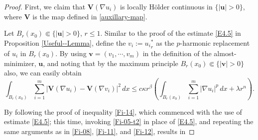 \documentclass{amsart}
\begin{document}
\begin{proof}
First, we claim that 
$\mathbf{V}(\nabla u_i)$ is locally H\"older continuous in $\{|\mathbf{u}|>0\}$, where $\mathbf{V}$ is the map defined in \eqref{auxillary-map}.



Let $B_{r}(x_0) \Subset \{|\mathbf{u}|>0\}$, $r \leq 1$.
Similar to the proof of the estimate \eqref{E4.5} in Proposition \ref{Useful--Lemma}, define the $v_i:={u_i}^{*}_r$ as the $p$-harmonic replacement of $u_i$ in $B_r(x_0)$.
By using $\mathbf{v}=(v_1, \cdots, v_m)$ in the definition of the almost-minimizer, $\mathbf{u}$, and noting that by the maximum principle $B_{r}(x_0) \Subset \{|\mathbf{v}|>0\}$ also, we can easily obtain 
\begin{equation}
\label{Fi-05-t2}
\int_{B_r(x_0)} \sum_{i=1}^{m} \left|\mathbf{V}(\nabla u_i)-\mathbf{V}(\nabla v_i) \right|^2 \, dx \leq c \kappa r^{\beta} \left( 
\int_{B_{r}(x_0)} \sum_{i=1}^{m} \left|\nabla u_i \right|^p \, dx
+ \lambda r^{n} \right).
\end{equation}


By following the proof of inequality \eqref{Fi-14}, which commenced with the use of estimate \eqref{E4.5}; this time, invoking \eqref{Fi-05-t2} in place of \eqref{E4.5}, and repeating the same arguments as in \eqref{Fi-08}, \eqref{Fi-11}, and \eqref{Fi-12}, results in 


\end{proof}
\end{document}
